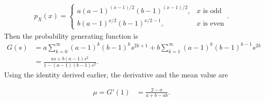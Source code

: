 \documentclass[a4paper,12pt]{article}
\begin{document}
\begin{enumerate}
\begin{align*}
            p_X(x) =
            \begin{cases}
                a(a - 1)^{(x - 1) / 2}(b - 1)^{(x - 1) / 2}, & x \text{ is odd} \\
                b(a - 1)^{x / 2}(b - 1)^{x / 2 - 1}, & x \text{ is even}
            \end{cases}.
        \end{align*}
        Then the probability generating function is
        \begin{align*}
            G(s) &= a \sum_{k = 0}^\infty (a - 1)^k (b - 1)^k s^{2k + 1} + b \sum_{k = 1}^\infty (a - 1)^k (b - 1)^{k - 1} s^{2k} \\
            &= \frac{as + b(a - 1)s^2}{1 - (a - 1)(b - 1)s^2}.
        \end{align*}
        Using the identity derived earlier, the derivative and the mean value are
        \iffalse
        \begin{align*}
            G'(s) &= \frac{\frac{d}{ds}(as + b(a - 1)s^2) - \frac{d}{ds}(1 - (a - 1)(b - 1)s^2)}{1 - (a - 1)(b - 1)s^2} \\
            &= \frac{a + 2b(a - 1)s + 2(a - 1)(b - 1)s}{1 - (a - 1)(b - 1)s^2} \\
            \mu = G'(1) &= \frac{a + 2ab - 2b + 2ab - 2a - 2b + 2}{a + b - ab} \\
            &= \frac{2 - a - 4b + 4ab}{a + b - ab}.
        \end{align*}
        \fi
        \begin{align*}
            \mu = G'(1) &= \frac{2 - a}{a + b - ab}.
        \end{align*}
\end{enumerate}
\end{document}
